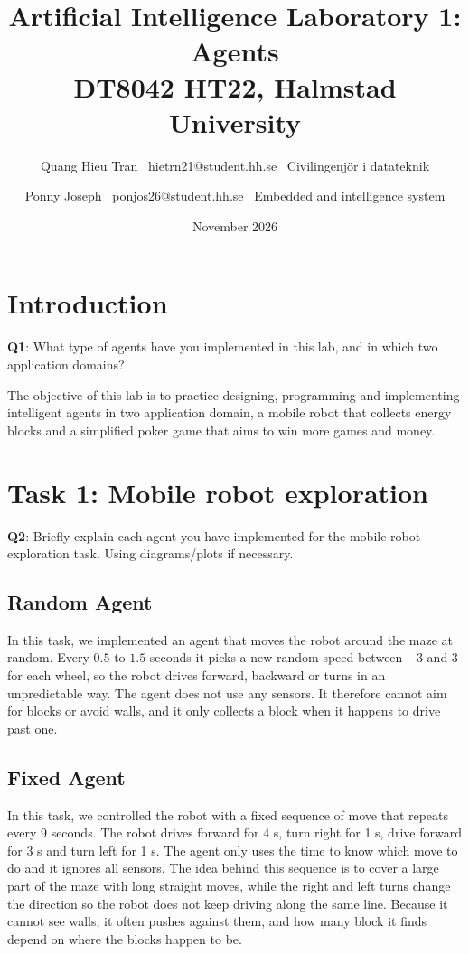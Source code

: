 \documentclass{article}
\title{Artificial Intelligence Laboratory 1: Agents \\ DT8042 HT22, Halmstad University}
\author{Quang Hieu Tran \ hietrn21@student.hh.se \ Civilingenjör i datateknik
  \and Ponny Joseph \ ponjos26@student.hh.se \ Embedded and intelligence system}
\date{November 2026}
\begin{document}
\maketitle
\section*{Introduction}

\begin{tcolorbox}
\textbf{Q1}: What type of agents have you implemented in this lab, and in which two application domains?
\end{tcolorbox}

The objective of this lab is to practice designing, programming and implementing intelligent agents in two application domain, a mobile robot that collects energy blocks and a simplified poker game that aims to win more games and money. 



\section*{Task 1: Mobile robot exploration}

\begin{tcolorbox}
\textbf{Q2}: Briefly explain each agent you have implemented for the mobile robot exploration task. Using diagrams/plots if necessary.
\end{tcolorbox}

\subsection*{Random Agent}
In this task, we implemented an agent that moves the robot around the maze at random. Every $0.5$ to $1.5$ seconds it picks a new random speed between $-3$ and $3$ for each wheel, so the robot drives forward, backward or turns in an unpredictable way. The agent does not use any sensors. It therefore cannot aim for blocks or avoid walls, and it only collects a block when it happens to drive past one.

\subsection*{Fixed Agent}
In this task, we controlled the robot with a fixed sequence of move that repeats every 9 seconds. The robot drives forward for 4 s, turn right for 1 s, drive forward for 3 s and turn left for 1 s. The agent only uses the time to know which move to do and it ignores all sensors. The idea behind this sequence is to cover a large part of the maze with long straight moves, while the right and left turns change the direction so the robot does not keep driving along the same line. Because it cannot see walls, it often pushes against them, and how many block it finds depend on where the blocks happen to be.
\end{document}
